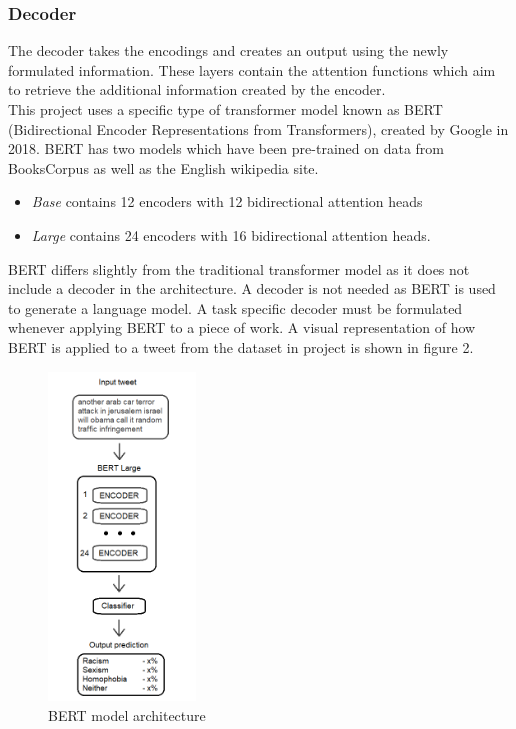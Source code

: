 \documentclass[conference]{IEEEtran}
\begin{document}
\subsubsection{\textbf{Decoder}} The decoder takes the encodings and creates an output using the newly formulated information. These layers contain the attention functions which aim to retrieve the additional information created by the encoder.\\

This project uses a specific type of transformer model known as BERT (Bidirectional Encoder Representations from Transformers), created by Google in 2018\cite{6}. BERT has two models which have been pre-trained on data from BooksCorpus\cite{18} as well as the English wikipedia site. 

\begin{itemize}
  \item \textit{Base} contains 12 encoders with 12 bidirectional attention heads
  \item \textit{Large} contains 24 encoders with 16 bidirectional attention heads.\\
\end{itemize}

BERT differs slightly from the traditional transformer model as it does not include a decoder in the architecture. A decoder is not needed as BERT is used to generate a language model. A task specific decoder must be formulated whenever applying BERT to a piece of work. A visual representation of how BERT is applied to a tweet from the dataset in project is shown in figure 2.

\begin{figure}[h]
    \centering
    \includegraphics[width=0.35\textwidth]{BERT_model.png}
    \caption{BERT model architecture}
    \label{fig:bert_architecture}
\end{figure}
\end{document}

